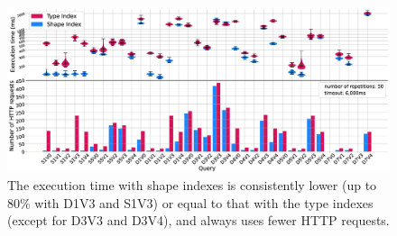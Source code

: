 \begin{figure}
  \centering
  \includegraphics[width=0.90\linewidth]{figure/combined}
  \caption{
  The execution time with shape indexes is consistently lower (up to 80\% with D1V3 and S1V3) or equal to that with the type indexes (except for D3V3 and D3V4), and always uses fewer HTTP requests.
  }
  \label{fig:result}
\end{figure}